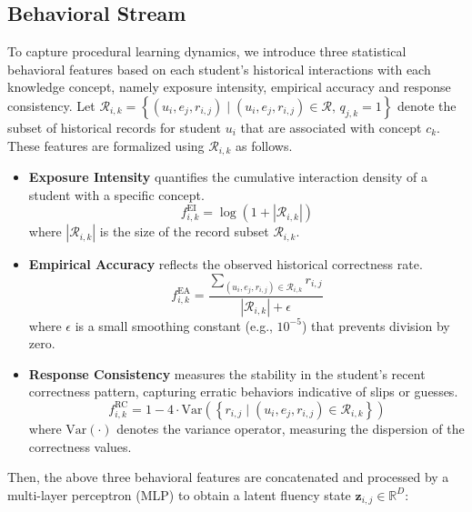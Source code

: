 \documentclass[a4paper,runningheads]{llncs}
\begin{document}
\subsection{Behavioral Stream}
To capture procedural learning dynamics, we introduce three statistical behavioral features based on each student's historical interactions with each knowledge concept, namely exposure intensity, empirical accuracy and response consistency. Let $\mathcal{R}_{i,k} = \left\{\left(u_i, e_j, r_{i,j}\right) \mid \left(u_i, e_j, r_{i,j}\right) \in \mathcal{R}, \, q_{j,k} = 1\right\}$ denote the subset of historical records for student $u_i$ that are associated with concept $c_k$. These features are formalized using $\mathcal{R}_{i,k}$ as follows.

\begin{itemize}
    \item \textbf{Exposure Intensity} quantifies the cumulative interaction density of a student with a specific concept.
        \begin{equation}
        f_{i,k}^{\text{EI}} = \log\left(1 + |\mathcal{R}_{i,k}|\right)
        \end{equation}
    where $|\mathcal{R}_{i,k}|$ is the size of the record subset $\mathcal{R}_{i,k}$.

    \item \textbf{Empirical Accuracy} reflects the observed historical correctness rate.
        \begin{equation}
        f_{i,k}^{\text{EA}}  = \frac{\sum_{(u_i, e_j, r_{i,j}) \in \mathcal{R}_{i,k}} r_{i,j}}{|\mathcal{R}_{i,k}| + \epsilon}
        \end{equation}
    where $\epsilon$ is a small smoothing constant (e.g., $10^{-5}$) that prevents division by zero.

    \item \textbf{Response Consistency} measures the stability in the student's recent correctness pattern, capturing erratic behaviors indicative of slips or guesses.
        \begin{equation}
        f_{i,k}^{\text{RC}}  = 1-4\cdot \text{Var}\left(\left\{r_{i,j} \mid (u_i, e_j, r_{i,j}) \in \mathcal{R}_{i,k}\right\}\right)
        \end{equation}
    where $\text{Var}(\cdot)$ denotes the variance operator, measuring the dispersion of the correctness values.
\end{itemize}
Then, the above three behavioral features are concatenated and processed by a multi-layer perceptron (MLP) to obtain a latent fluency state $\bm{z}_{i,j}\in \mathbb{R}^D$:
\end{document}
